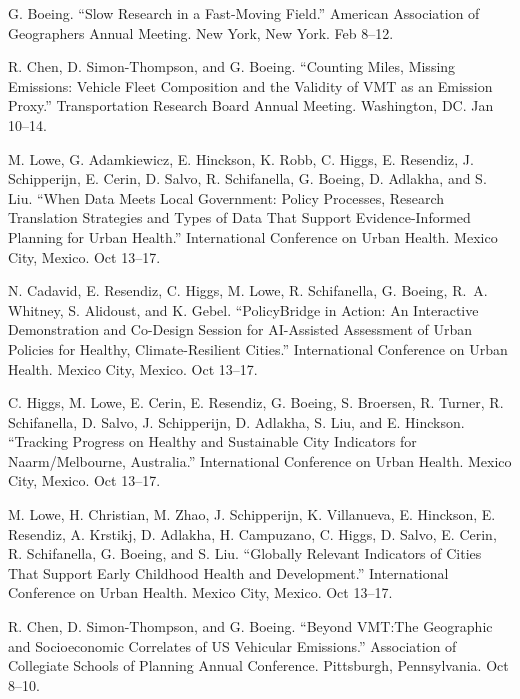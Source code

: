 \documentclass[11pt,letterpaper]{report} %
\begin{document}
\begin{tablist}

\item[2027] \tab{}G. Boeing. \enquote{Slow Research in a Fast-Moving Field.} American Association of Geographers Annual Meeting. New York, New York. Feb 8--12.

\item[2027] \tab{}R. Chen, D. Simon-Thompson, and G. Boeing. \enquote{Counting Miles, Missing Emissions: Vehicle Fleet Composition and the Validity of VMT as an Emission Proxy.} Transportation Research Board Annual Meeting. Washington, DC\@. Jan 10--14.

\item[2026] \tab{}M. Lowe, G. Adamkiewicz, E. Hinckson, K. Robb, C. Higgs, E. Resendiz, J. Schipperijn, E. Cerin, D. Salvo, R. Schifanella, G. Boeing, D. Adlakha, and S. Liu. \enquote{When Data Meets Local Government: Policy Processes, Research Translation Strategies and Types of Data That Support Evidence-Informed Planning for Urban Health.} International Conference on Urban Health. Mexico City, Mexico. Oct 13--17.

\item[2026] \tab{}N. Cadavid, E. Resendiz, C. Higgs, M. Lowe, R. Schifanella, G. Boeing, R.~A. Whitney, S. Alidoust, and K. Gebel. \enquote{PolicyBridge in Action: An Interactive Demonstration and Co-Design Session for AI-Assisted Assessment of Urban Policies for Healthy, Climate-Resilient Cities.} International Conference on Urban Health. Mexico City, Mexico. Oct 13--17.

\item[2026] \tab{}C. Higgs, M. Lowe, E. Cerin, E. Resendiz, G. Boeing, S. Broersen, R. Turner, R. Schifanella, D. Salvo, J. Schipperijn, D. Adlakha, S. Liu, and E. Hinckson. \enquote{Tracking Progress on Healthy and Sustainable City Indicators for Naarm/Melbourne, Australia.} International Conference on Urban Health. Mexico City, Mexico. Oct 13--17.

\item[2026] \tab{}M. Lowe, H. Christian, M. Zhao, J. Schipperijn, K. Villanueva, E. Hinckson, E. Resendiz, A. Krstikj, D. Adlakha, H. Campuzano, C. Higgs, D. Salvo, E. Cerin, R. Schifanella, G. Boeing, and S. Liu. \enquote{Globally Relevant Indicators of Cities That Support Early Childhood Health and Development.} International Conference on Urban Health. Mexico City, Mexico. Oct 13--17.

\item[2026] \tab{}R. Chen, D. Simon-Thompson, and G. Boeing. \enquote{Beyond VMT:\@ The Geographic and Socioeconomic Correlates of US Vehicular Emissions.} Association of Collegiate Schools of Planning Annual Conference. Pittsburgh, Pennsylvania. Oct 8--10.


\end{tablist}
\end{document}
